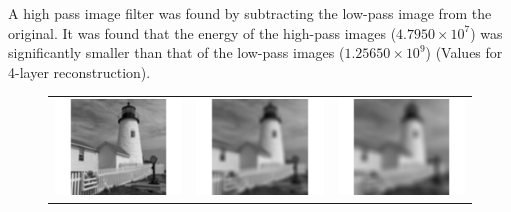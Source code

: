 \documentclass{article}					%
\begin{document}
A high pass image filter was found by subtracting the low-pass image from the original. It was found that the energy of the high-pass images ($4.7950\times 10^7$) was significantly smaller than that of the low-pass images ($1.25650\times 10^9$) (Values for 4-layer reconstruction).
\begin{figure}[ht!]
\begin{centering}
\begin{tabular}{c c c}
  \includegraphics{10} & \includegraphics{14} & \includegraphics{12}\\

\end{tabular}
\end{centering}
\end{figure}
\end{document}
